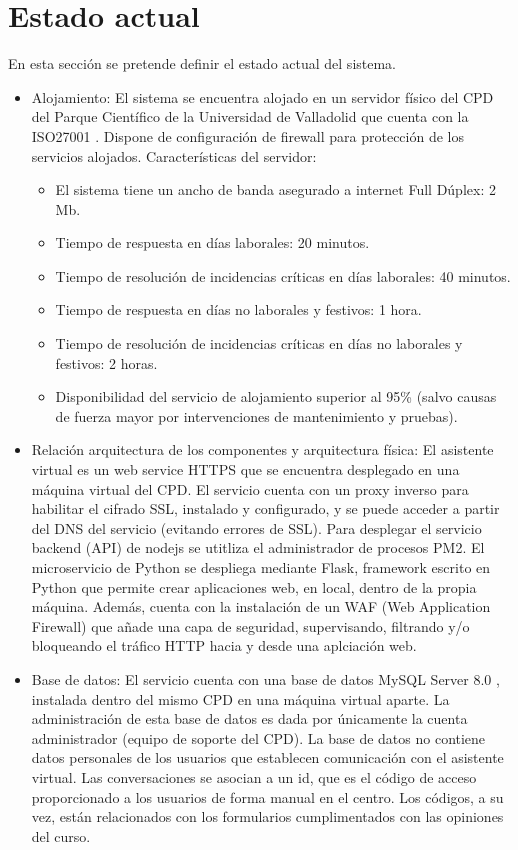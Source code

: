 \section{Estado actual}

En esta sección se pretende definir el estado actual del sistema. 


\begin{itemize}
    \item Alojamiento: El sistema se encuentra alojado en un servidor físico del CPD del Parque Científico de la Universidad de Valladolid que cuenta con la ISO27001 \cite{ISO27001}. Dispone de configuración de firewall para protección de los servicios alojados. Características del servidor:
\begin{itemize}
        \item El sistema tiene un ancho de banda asegurado a internet Full Dúplex: 2 Mb.
        \item Tiempo de respuesta en días laborales: 20 minutos.
        \item Tiempo de resolución de incidencias críticas en días laborales: 40 minutos.
        \item Tiempo de respuesta en días no laborales y festivos: 1 hora.
        \item Tiempo de resolución de incidencias críticas en días no laborales y festivos: 2 horas.
        \item Disponibilidad del servicio de alojamiento superior al 95\% (salvo causas de fuerza mayor por intervenciones de mantenimiento y pruebas).
\end{itemize}
    \item Relación arquitectura de los componentes y arquitectura física: El asistente virtual es un web service HTTPS que se encuentra desplegado en una máquina virtual del CPD. El servicio cuenta con un proxy inverso para habilitar el cifrado SSL, instalado y configurado, y se puede acceder a partir del DNS del servicio (evitando errores de SSL). Para desplegar el servicio backend (API) de nodejs se utitliza el administrador de procesos PM2. El microservicio de Python se despliega mediante Flask, framework escrito en Python que permite crear aplicaciones web, en local, dentro de la propia máquina. Además, cuenta con la instalación de un WAF (Web Application Firewall) que añade una capa de seguridad, supervisando, filtrando y/o bloqueando el tráfico HTTP hacia y desde una aplciación web.
    \item Base de datos: El servicio cuenta con una base de datos MySQL Server 8.0 \cite{mysql}, instalada dentro del mismo CPD en una máquina virtual aparte. La administración de esta base de datos es dada por únicamente la cuenta administrador (equipo de soporte del CPD). La base de datos no contiene datos personales de los usuarios que establecen comunicación con el asistente virtual. Las conversaciones se asocian a un id, que es el código de acceso proporcionado a los usuarios de forma manual en el centro. Los códigos, a su vez, están relacionados con los formularios cumplimentados con las opiniones del curso.

\end{itemize}
